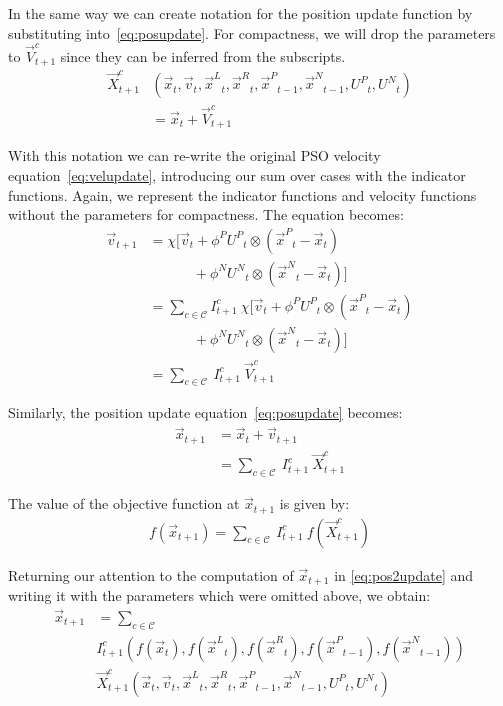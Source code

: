 \documentclass[smallcondensed]{svjour3}
\providecommand{\pers}{\ensuremath{P}}
\providecommand{\neigh}{\ensuremath{N}}
\providecommand{\leftind}{\ensuremath{L}}
\providecommand{\rightind}{\ensuremath{R}}
\providecommand{\nURand}{\ensuremath{U^\neigh}}
\providecommand{\pURand}{\ensuremath{U^\pers}}
\providecommand{\ppos}{\ensuremath{\Vec{x}}}
\providecommand{\pvel}{\ensuremath{\Vec{v}}}
\providecommand{\nbest}{\ensuremath{\Vec{x}^\neigh}}
\providecommand{\pbest}{\ensuremath{\Vec{x}^\pers}}
\providecommand{\constriction}{\ensuremath{\chi}}
\providecommand{\ncoeff}{\ensuremath{\phi^\neigh}}
\providecommand{\pcoeff}{\ensuremath{\phi^\pers}}
\providecommand{\ofunc}{\ensuremath{f}}
\providecommand{\indic}{\ensuremath{I}}
\providecommand{\specvel}{\ensuremath{\vec{V}}}
\providecommand{\specpos}{\ensuremath{\vec{X}}}
\providecommand{\leftn}{\ensuremath{\Vec{x}^\leftind}}
\providecommand{\rightn}{\ensuremath{\Vec{x}^\rightind}}
\providecommand{\caseset}{\ensuremath{\mathcal{C}}}
\providecommand{\casegen}{\ensuremath{c}}
\begin{document}
In the same way we can create notation for the position update function by
substituting into~\eqref{eq:posupdate}.  For compactness, we will drop the
parameters to $\specvel_{t+1}^{\casegen}$ since they can be inferred from the
subscripts.
\begin{align}
\label{eq:defpcasegen}
	\specpos_{t+1}^{\casegen} & (\ppos_{t}, \pvel_{t}, \leftn_{t},
	\rightn_{t} ,\pbest_{t-1} ,\nbest_{t-1}, \pURand_{t}, \nURand_{t}) \\
\nonumber
	& = \ppos_{t} + \specvel_{t+1}^{\casegen}
\end{align}

With this notation we can re-write the original PSO velocity
equation~\eqref{eq:velupdate}, introducing our sum over cases with the
indicator functions.  Again, we represent the indicator functions and velocity
functions without the parameters for compactness.  The equation becomes:
\begin{align}
\nonumber
	\pvel_{t+1} &=
		\constriction \bigl[ \pvel_t
			+ \pcoeff\pURand_{t}\otimes(\pbest_{t} - \ppos_{t}) \\
\nonumber
			& \quad \quad \quad \, + \ncoeff\nURand_{t}\otimes(\nbest_{t} -
			\ppos_{t}) \bigr] \\
\nonumber
	&= \sum_{c \in \caseset} \indic_{t+1}^{c} \ \constriction \bigl[ \pvel_t
			+ \pcoeff\pURand_{t}\otimes(\pbest_{t} - \ppos_{t}) \\
\nonumber
			& \quad \quad \quad \, + \ncoeff\nURand_{t}\otimes(\nbest_{t} -
			\ppos_{t}) \bigr]  \\
\label{eq:vel2update}
	&= \sum_{c \in \caseset} \ \indic_{t+1}^{c} \ \specvel_{t+1}^{c} 
\end{align}

Similarly, the position update equation~\eqref{eq:posupdate} becomes:
\begin{align}
\nonumber
	\ppos_{t+1} &= \ppos_{t} + \pvel_{t+1} \\
\label{eq:pos2update}
	&= \sum_{c \in \caseset} \ \indic_{t+1}^{c} \ \specpos_{t+1}^{c} 
\end{align}

The value of the objective function at $\ppos_{t+1}$ is given by:
\begin{align}
\label{eq:val2update}
	\ofunc (\ppos_{t+1}) = \sum_{c \in \caseset} \ \indic_{t+1}^{c}
	\ \ofunc(\specpos_{t+1}^{c})
\end{align}

Returning our attention to the computation of $\ppos_{t+1}$ in
\eqref{eq:pos2update} and writing it with the parameters which were omitted
above, we obtain:
\begin{align}
\nonumber
  \ppos_{t+1} &= \sum_{c \in \caseset} \\
\nonumber
	& \indic_{t+1}^{c}(\ofunc ( \ppos_{t} ) ,\ofunc(\leftn_{t}),
	\ofunc(\rightn_{t}) ,\ofunc(\pbest_{t-1}) ,\ofunc(\nbest_{t-1})) \\
\label{eq:val2updatelong}
	& \specpos_{t+1}^{c}(\ppos_{t},\pvel_{t},\leftn_{t},\rightn_{t},
	\pbest_{t-1},\nbest_{t-1},\pURand_{t}, \nURand_{t})
\end{align}
\end{document}
